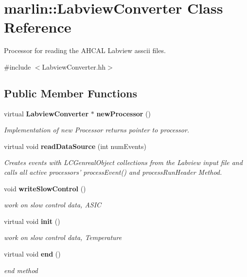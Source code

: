 \section{marlin::LabviewConverter Class Reference}
\label{classmarlin_1_1LabviewConverter}


Processor for reading the AHCAL Labview asscii files.  


{\ttfamily \#include $<$LabviewConverter.hh$>$}\subsection*{Public Member Functions}
\begin{DoxyCompactItemize}
\item 
virtual {\bf LabviewConverter} $\ast$ {\bf newProcessor} ()\label{classmarlin_1_1LabviewConverter_ac445a8f712cbc96fd9f90c190dad8347}

\begin{DoxyCompactList}\small\item\em Implementation of new Processor returns pointer to processor. \item\end{DoxyCompactList}\item 
virtual void {\bf readDataSource} (int numEvents)\label{classmarlin_1_1LabviewConverter_ad865613e9671e541a1e64ecd8c9c897b}

\begin{DoxyCompactList}\small\item\em Creates events with LCGenrealObject collections from the Labview input file and calls all active processors' processEvent() and processRunHeader Method. \item\end{DoxyCompactList}\item 
void {\bf writeSlowControl} ()\label{classmarlin_1_1LabviewConverter_a3e5cfb39a19c0ca17ac3ecdb3c9f85e7}

\begin{DoxyCompactList}\small\item\em work on slow control data, ASIC \item\end{DoxyCompactList}\item 
virtual void {\bf init} ()
\begin{DoxyCompactList}\small\item\em work on slow control data, Temperature \item\end{DoxyCompactList}\item 
virtual void {\bf end} ()\label{classmarlin_1_1LabviewConverter_ae1700a9004281db26476d22b5cc7c10b}

\begin{DoxyCompactList}\small\item\em end method \item\end{DoxyCompactList}\end{DoxyCompactItemize}
